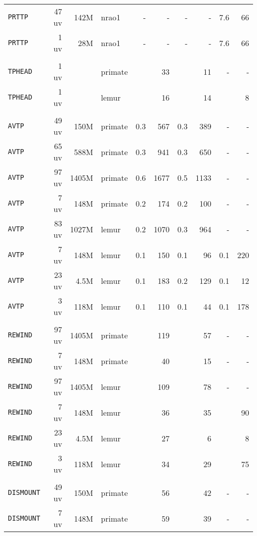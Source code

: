 \begin{center}
\begin{tabular}{lrrlrrrrrr}
{\tt PRTTP} &47 uv&  142M&nrao1  &     -&    -&     -&    -&   7.6&   66\\
{\tt PRTTP} & 1 uv&   28M&nrao1  &     -&    -&     -&    -&   7.6&   66\\
\\
{\tt TPHEAD}& 1 uv&      &primate&      &   33&      &   11&     -&    -\\
{\tt TPHEAD}& 1 uv&      &lemur  &      &   16&      &   14&      &    8\\
\\
{\tt AVTP}  &49 uv&  150M&primate&   0.3&  567&   0.3&  389&     -&    -\\
{\tt AVTP}  &65 uv&  588M&primate&   0.3&  941&   0.3&  650&     -&    -\\
{\tt AVTP}  &97 uv& 1405M&primate&   0.6& 1677&   0.5& 1133&     -&    -\\
{\tt AVTP}  & 7 uv&  148M&primate&   0.2&  174&   0.2&  100&     -&    -\\
{\tt AVTP}  &83 uv& 1027M&lemur  &   0.2& 1070&   0.3&  964&     -&    -\\
{\tt AVTP}  & 7 uv&  148M&lemur  &   0.1&  150&   0.1&   96&   0.1&  220\\
{\tt AVTP}  &23 uv&  4.5M&lemur  &   0.1&  183&   0.2&  129&   0.1&   12\\
{\tt AVTP}  & 3 uv&  118M&lemur  &   0.1&  110&   0.1&   44&   0.1&  178\\
\\
{\tt REWIND}&97 uv& 1405M&primate&      &  119&      &   57&     -&    -\\
{\tt REWIND}& 7 uv&  148M&primate&      &   40&      &   15&     -&    -\\
{\tt REWIND}&97 uv& 1405M&lemur  &      &  109&      &   78&     -&    -\\
{\tt REWIND}& 7 uv&  148M&lemur  &      &   36&      &   35&      &   90\\
{\tt REWIND}&23 uv&  4.5M&lemur  &      &   27&      &    6&      &    8\\
{\tt REWIND}& 3 uv&  118M&lemur  &      &   34&      &   29&      &   75\\
\\
{\tt DISMOUNT}&49 uv&  150M&primate&      &   56&      &   42&     -&    -\\
{\tt DISMOUNT}& 7 uv&  148M&primate&      &   59&      &   39&     -&    -\\
\hline
\end{tabular}
\end{center}
\vfill\eject

